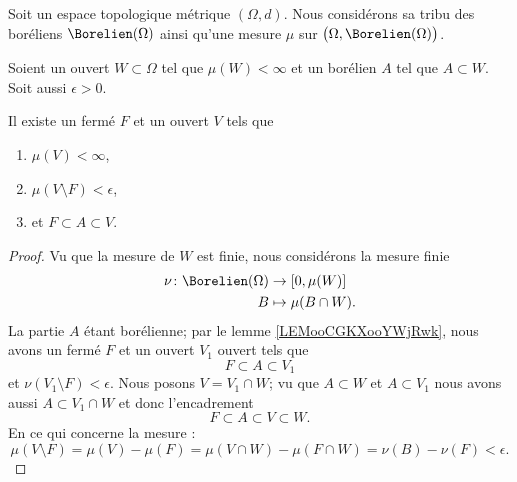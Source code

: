 \begin{lemma}       \label{LEMooZDFVooFUgFGZ}
    Soit un espace topologique métrique \( (\Omega,d)\). Nous considérons sa tribu des boréliens \( \Borelien(\Omega)\) ainsi qu'une mesure \( \mu\) sur \( \big(\Omega,\Borelien(\Omega)\big)\). 

    Soient un ouvert \( W\subset \Omega\) tel que \( \mu(W)<\infty\) et un borélien \( A\) tel que \( A\subset W\). Soit aussi \( \epsilon>0\).

    Il existe un fermé \( F\) et un ouvert \( V\) tels que 
    \begin{enumerate}
        \item \( \mu(V)<\infty\),
        \item
     \( \mu(V\setminus F)<\epsilon\),
 \item et $F\subset A\subset V$.
    \end{enumerate}
\end{lemma}

\begin{proof}
    Vu que la mesure de \( W\) est finie, nous considérons la mesure finie
    \begin{equation}
        \begin{aligned}
            \nu\colon \Borelien(\Omega)&\to \mathopen[ 0 , \mu(W) \mathclose] \\
            B&\mapsto \mu(B\cap W). 
        \end{aligned}
    \end{equation}
    La partie \( A\) étant borélienne; par le lemme \ref{LEMooCGKXooYWjRwk}, nous avons un fermé \( F\) et un ouvert \( V_1\) ouvert tels que
    \begin{equation}
        F\subset A\subset V_1
    \end{equation}
    et \( \nu(V_1\setminus F)<\epsilon\). Nous posons \( V=V_1\cap W\); vu que \( A\subset W\) et \( A\subset V_1\) nous avons aussi \( A\subset V_1\cap  W\) et donc l'encadrement
    \begin{equation}
        F\subset A\subset V\subset W.
    \end{equation}
    En ce qui concerne la mesure :
    \begin{equation}
        \mu(V\setminus F)=\mu(V)-\mu(F)=\mu(V\cap W)-\mu(F\cap W)=\nu(B)-\nu(F)<\epsilon.
    \end{equation}
\end{proof}

